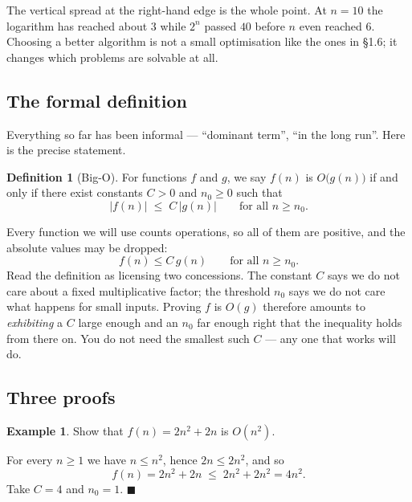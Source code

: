 \documentclass[11pt]{article}
\theoremstyle{plain}
\theoremstyle{definition}
\newtheorem{defn}{Definition}[section]
\newtheorem{ex}{Example}[section]
\theoremstyle{remark}
\begin{document}
\noindent The vertical spread at the right-hand edge is the whole point. At
$n=10$ the logarithm has reached about $3$ while $2^{n}$ passed $40$ before
$n$ even reached $6$. Choosing a better algorithm is not a small optimisation
like the ones in \S1.6; it changes which problems are solvable at all.

\subsection{The formal definition}
Everything so far has been informal --- ``dominant term'', ``in the long run''.
Here is the precise statement.

\begin{defn}[Big-O]
For functions $f$ and $g$, we say $f(n)$ is $O\bigl(g(n)\bigr)$ if and only if
there exist constants $C>0$ and $n_0\ge0$ such that
\[
  \lvert f(n)\rvert \;\le\; C\,\bigl\lvert g(n)\bigr\rvert
  \qquad\text{for all } n\ge n_0 .
\]
\end{defn}

\noindent Every function we will use counts operations, so all of them are
positive, and the absolute values may be dropped:
\[
  f(n) \le C\,g(n) \qquad\text{for all } n\ge n_0 .
\]
Read the definition as licensing two concessions. The constant $C$ says we do
not care about a fixed multiplicative factor; the threshold $n_0$ says we do not
care what happens for small inputs. Proving $f$ is $O(g)$ therefore amounts to
\emph{exhibiting} a $C$ large enough and an $n_0$ far enough right that the
inequality holds from there on. You do not need the smallest such $C$ --- any
one that works will do.

\subsection{Three proofs}
\begin{ex}
Show that $f(n)=2n^{2}+2n$ is $O(n^{2})$.

For every $n\ge1$ we have $n\le n^{2}$, hence $2n\le 2n^{2}$, and so
\[
  f(n) = 2n^{2}+2n \;\le\; 2n^{2}+2n^{2} = 4n^{2} .
\]
Take $C=4$ and $n_0=1$. \hfill$\blacksquare$
\end{ex}
\end{document}
